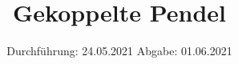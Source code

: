 

\subject{Versuch Nr.106}
\title{Gekoppelte Pendel}
\date{%
  Durchführung: 24.05.2021
  \hspace{3em}
  Abgabe: 01.06.2021
}



\maketitle
\thispagestyle{empty}
\tableofcontents
\newpage 






%


\nocite{*}

\printbibliography


